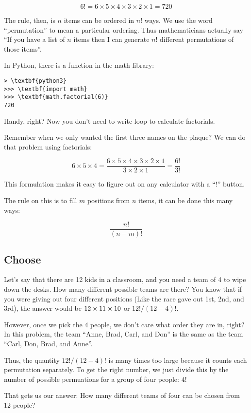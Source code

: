 $$6! = 6 \times 5 \times 4 \times 3 \times 2 \times 1 = 720$$

The rule, then, is $n$ items can be ordered in $n!$ ways. We use the
word ``permutation'' to mean a particular ordering.  Thus
mathematicians actually say ``If you have a list of $n$ items then I
can generate $n!$ different permutations of those items''.

In Python, there is a  function in the math library:
\begin{Verbatim}[commandchars=\\\{\}]
> \textbf{python3} 
>>> \textbf{import math}
>>> \textbf{math.factorial(6)}
720
\end{Verbatim}

Handy, right? Now you don't need to write loop to calculate factorials.

Remember when we only wanted the first three names on the plaque? We can do that problem using factorials:

$$6 \times 5 \times 4 = \frac{6 \times 5 \times 4 \times 3 \times 2 \times 1}{3 \times 2 \times 1} = \frac{6!}{3!}$$

This formulation makes it easy to figure out on any calculator with a ``!'' button.

The rule on this is to fill $m$ positions from $n$ items, it can be done this many ways:

$$\frac{n!}{(n-m)!}$$

\subsection{Choose}

Let's say that there are 12 kids in a classroom, and you need a team
of 4 to wipe down the desks.  How many different possible teams are
there? You know that if you were giving out four different positions
(Like the race gave out 1st, 2nd, and 3rd), the answer would be $12
\times 11 \times 10 \time 9$ or $12! / (12 - 4)!$.

However, once we pick the 4 people, we don't care what order they are
in, right?  In this problem, the team ``Anne, Brad, Carl, and Don'' is
the same as the team ``Carl, Don, Brad, and Anne''.

Thus, the quantity $12! / (12 - 4)!$ is many times too large because
it counts each permutation separately.  To get the right number, we
just divide this by the number of possible permuations for a group of
four people: $4!$

That gets us our answer: How many different teams of four can be chosen from 12 people?

